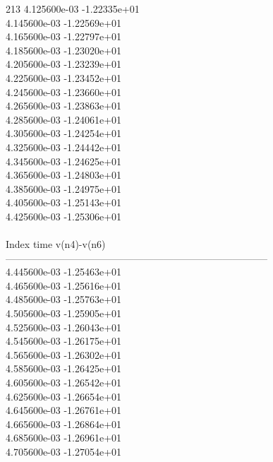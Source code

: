 213	4.125600e-03	-1.22335e+01	\\ 	4.145600e-03	-1.22569e+01	\\ 	4.165600e-03	-1.22797e+01	\\ 	4.185600e-03	-1.23020e+01	\\ 	4.205600e-03	-1.23239e+01	\\ 	4.225600e-03	-1.23452e+01	\\ 	4.245600e-03	-1.23660e+01	\\ 	4.265600e-03	-1.23863e+01	\\ 	4.285600e-03	-1.24061e+01	\\ 	4.305600e-03	-1.24254e+01	\\ 	4.325600e-03	-1.24442e+01	\\ 	4.345600e-03	-1.24625e+01	\\ 	4.365600e-03	-1.24803e+01	\\ 	4.385600e-03	-1.24975e+01	\\ 	4.405600e-03	-1.25143e+01	\\ 	4.425600e-03	-1.25306e+01	\\ \hline
\\ \hline
Index   time            v(n4)-v(n6)     \\ \hline
--------------------------------------------------------------------------------\\ 	4.445600e-03	-1.25463e+01	\\ 	4.465600e-03	-1.25616e+01	\\ 	4.485600e-03	-1.25763e+01	\\ 	4.505600e-03	-1.25905e+01	\\ 	4.525600e-03	-1.26043e+01	\\ 	4.545600e-03	-1.26175e+01	\\ 	4.565600e-03	-1.26302e+01	\\ 	4.585600e-03	-1.26425e+01	\\ 	4.605600e-03	-1.26542e+01	\\ 	4.625600e-03	-1.26654e+01	\\ 	4.645600e-03	-1.26761e+01	\\ 	4.665600e-03	-1.26864e+01	\\ 	4.685600e-03	-1.26961e+01	\\ 	4.705600e-03	-1.27054e+01	\\ \hline

